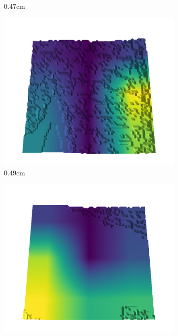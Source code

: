 \documentclass[../document.tex]{subfiles}
\begin{document}
\begin{figure}[H]
\begin{subfigure}[b]{0.192\linewidth}
    \caption{0.47cm}
    \label{fig : quarry-best-8}
    \end{subfigure}
    \begin{subfigure}[b]{0.192\linewidth}
    \includegraphics[width=\linewidth]{../img/5/quarry/best/49-patch-3d-majavi-colormap-80.png}
    \caption{0.49cm}
    \label{fig : quarry-best-9}
    \end{subfigure}
    \begin{subfigure}[b]{0.192\linewidth}
    \includegraphics[width=\linewidth]{../img/5/quarry/best/51-patch-3d-majavi-colormap-90.png}

\end{subfigure}
\end{figure}
\end{document}
